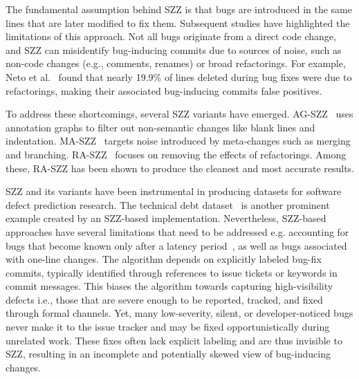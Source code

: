 \documentclass[\main/thesis.tex]{subfiles}
\begin{document}
The fundamental assumption behind SZZ is that bugs are introduced in the same lines that are later modified to fix them. Subsequent studies have highlighted the limitations of this approach. Not all bugs originate from a direct code change, and SZZ can misidentify bug-inducing commits due to sources of noise, such as non-code changes (e.g., comments, renames) or broad refactorings. For example, Neto et al.~\cite{neto2018impact} found that nearly 19.9\% of lines deleted during bug fixes were due to refactorings, making their associated bug-inducing commits false positives.


To address these shortcomings, several SZZ variants have emerged. AG-SZZ~\cite{kim2006automatic} uses annotation graphs to filter out non-semantic changes like blank lines and indentation. MA-SZZ~\cite{da2016framework} targets noise introduced by meta-changes such as merging and branching. RA-SZZ~\cite{neto2018impact} focuses on removing the effects of refactorings. Among these, RA-SZZ has been shown to produce the cleanest and most accurate results. 

SZZ and its variants have been instrumental in producing datasets for software defect prediction research. The technical debt dataset~\cite{TDD} is another prominent example created by an SZZ-based implementation. Nevertheless, SZZ-based approaches have several limitations that need to be addressed e.g. accounting for bugs that become known only after a latency period~\cite{cabral2019class}, as well as bugs associated with one-line changes. The algorithm depends on explicitly labeled bug-fix commits, typically identified through references to issue tickets or keywords in commit messages. This biases the algorithm towards capturing high-visibility defects i.e., those that are severe enough to be reported, tracked, and fixed through formal channels. Yet, many low-severity, silent, or developer-noticed bugs never make it to the issue tracker and may be fixed opportunistically during unrelated work. These fixes often lack explicit labeling and are thus invisible to SZZ, resulting in an incomplete and potentially skewed view of bug-inducing changes. 
\end{document}
